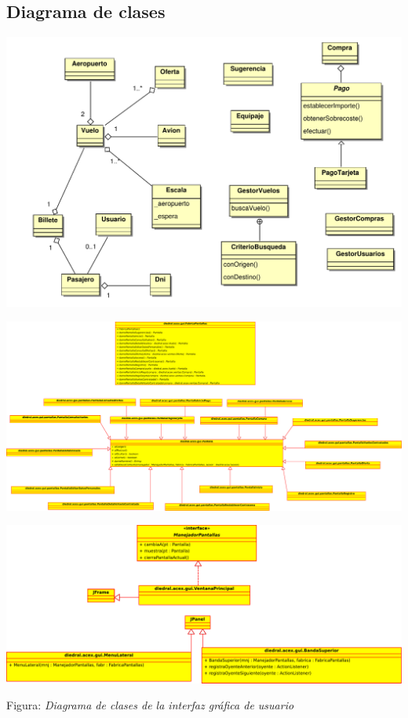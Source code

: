 \documentclass[11pt, a4paper, twoside, titlepage]{article}
\begin{document}
\begin{landscape}
		\subsection{Diagrama de clases}
			\begin{center}
				\hspace{-1cm}
				\includegraphics[scale=.8]{diseno/diagramas/diagramaclases.pdf}
			\end{center}
\end{landscape}

\begin{landscape}
			\begin{center}
				\vspace*{1cm}
				\includegraphics[scale=.4]{diseno/diagramas/clasespantallas.pdf}
			\end{center}
\end{landscape}

			\begin{center}
				\includegraphics[scale=.50]{diseno/diagramas/clasesGUI.pdf}

				Figura: {\itshape Diagrama de clases de la interfaz gráfica de usuario}
			\end{center}
\end{document}
